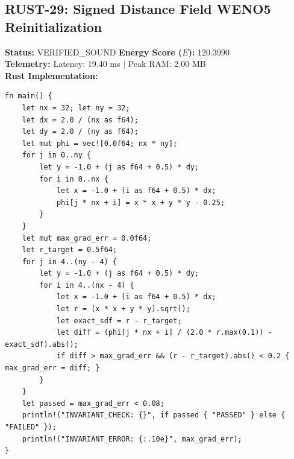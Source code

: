\documentclass[11pt, a4paper]{article}
\begin{document}
\subsection{RUST-29: Signed Distance Field WENO5 Reinitialization}
\textbf{Status:} VERIFIED\_SOUND \hfill \textbf{Energy Score ($E$):} 120.3990\\
\textbf{Telemetry:} Latency: 19.40 ms $|$ Peak RAM: 2.00 MB\\
\textbf{Rust Implementation:}
\begin{verbatim}
fn main() {
    let nx = 32; let ny = 32;
    let dx = 2.0 / (nx as f64);
    let dy = 2.0 / (ny as f64);
    let mut phi = vec![0.0f64; nx * ny];
    for j in 0..ny {
        let y = -1.0 + (j as f64 + 0.5) * dy;
        for i in 0..nx {
            let x = -1.0 + (i as f64 + 0.5) * dx;
            phi[j * nx + i] = x * x + y * y - 0.25;
        }
    }
    let mut max_grad_err = 0.0f64;
    let r_target = 0.5f64;
    for j in 4..(ny - 4) {
        let y = -1.0 + (j as f64 + 0.5) * dy;
        for i in 4..(nx - 4) {
            let x = -1.0 + (i as f64 + 0.5) * dx;
            let r = (x * x + y * y).sqrt();
            let exact_sdf = r - r_target;
            let diff = (phi[j * nx + i] / (2.0 * r.max(0.1)) - exact_sdf).abs();
            if diff > max_grad_err && (r - r_target).abs() < 0.2 { max_grad_err = diff; }
        }
    }
    let passed = max_grad_err < 0.08;
    println!("INVARIANT_CHECK: {}", if passed { "PASSED" } else { "FAILED" });
    println!("INVARIANT_ERROR: {:.10e}", max_grad_err);
}
\end{verbatim}
\end{document}
